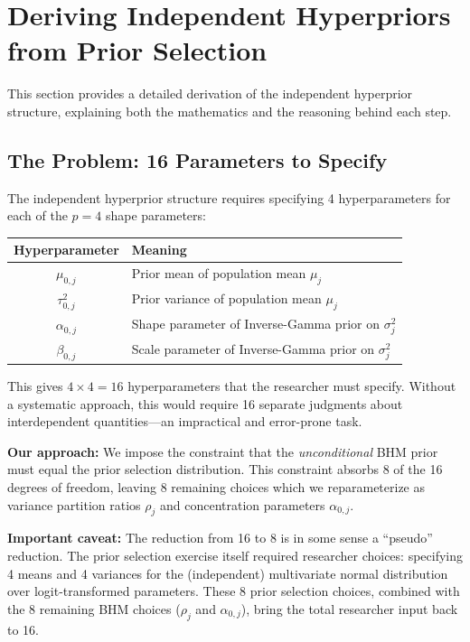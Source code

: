\documentclass[11pt]{article}
\begin{document}
\section{Deriving Independent Hyperpriors from Prior Selection}

This section provides a detailed derivation of the independent hyperprior structure, explaining both the mathematics and the reasoning behind each step.

\subsection{The Problem: 16 Parameters to Specify}

The independent hyperprior structure requires specifying 4 hyperparameters for each of the $p = 4$ shape parameters:
\begin{center}
\begin{tabular}{cl}
\toprule
Hyperparameter & Meaning \\
\midrule
$\mu_{0,j}$ & Prior mean of population mean $\mu_j$ \\
$\tau_{0,j}^2$ & Prior variance of population mean $\mu_j$ \\
$\alpha_{0,j}$ & Shape parameter of Inverse-Gamma prior on $\sigma_j^2$ \\
$\beta_{0,j}$ & Scale parameter of Inverse-Gamma prior on $\sigma_j^2$ \\
\bottomrule
\end{tabular}
\end{center}

This gives $4 \times 4 = 16$ hyperparameters that the researcher must specify. Without a systematic approach, this would require 16 separate judgments about interdependent quantities---an impractical and error-prone task.

\textbf{Our approach:} We impose the constraint that the \textit{unconditional} BHM prior must equal the prior selection distribution. This constraint absorbs 8 of the 16 degrees of freedom, leaving 8 remaining choices which we reparameterize as variance partition ratios $\rho_j$ and concentration parameters $\alpha_{0,j}$.

\textbf{Important caveat:} The reduction from 16 to 8 is in some sense a ``pseudo'' reduction. The prior selection exercise itself required researcher choices: specifying 4 means and 4 variances for the (independent) multivariate normal distribution over logit-transformed parameters. These 8 prior selection choices, combined with the 8 remaining BHM choices ($\rho_j$ and $\alpha_{0,j}$), bring the total researcher input back to 16.
\end{document}
